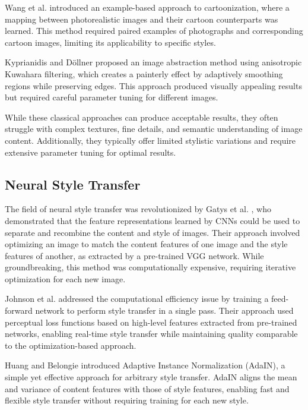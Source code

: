 \documentclass[conference]{IEEEtran}
\begin{document}
Wang et al. \cite{wang2004example} introduced an example-based approach to cartoonization, where a mapping between photorealistic images and their cartoon counterparts was learned. This method required paired examples of photographs and corresponding cartoon images, limiting its applicability to specific styles.

Kyprianidis and Döllner \cite{kyprianidis2008image} proposed an image abstraction method using anisotropic Kuwahara filtering, which creates a painterly effect by adaptively smoothing regions while preserving edges. This approach produced visually appealing results but required careful parameter tuning for different images.

While these classical approaches can produce acceptable results, they often struggle with complex textures, fine details, and semantic understanding of image content. Additionally, they typically offer limited stylistic variations and require extensive parameter tuning for optimal results.

\subsection{Neural Style Transfer}
The field of neural style transfer was revolutionized by Gatys et al. \cite{gatys2016image}, who demonstrated that the feature representations learned by CNNs could be used to separate and recombine the content and style of images. Their approach involved optimizing an image to match the content features of one image and the style features of another, as extracted by a pre-trained VGG network. While groundbreaking, this method was computationally expensive, requiring iterative optimization for each new image.

Johnson et al. \cite{johnson2016perceptual} addressed the computational efficiency issue by training a feed-forward network to perform style transfer in a single pass. Their approach used perceptual loss functions based on high-level features extracted from pre-trained networks, enabling real-time style transfer while maintaining quality comparable to the optimization-based approach.

Huang and Belongie \cite{huang2017arbitrary} introduced Adaptive Instance Normalization (AdaIN), a simple yet effective approach for arbitrary style transfer. AdaIN aligns the mean and variance of content features with those of style features, enabling fast and flexible style transfer without requiring training for each new style.
\end{document}
